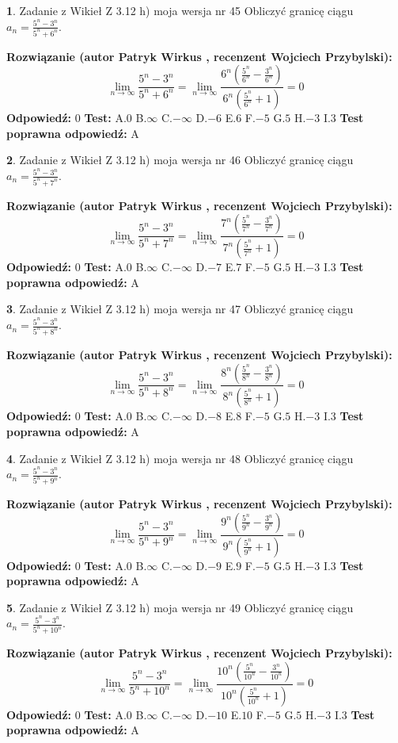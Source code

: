 \documentclass[12pt, a4paper]{article}
\theoremstyle{definition} %
\newtheorem{zad}{}
\newcommand{\zadStart}[1]{\begin{zad}#1\newline}
\newcommand{\zadStop}{\end{zad}}
\newcommand{\rozwStart}[2]{\noindent \textbf{Rozwiązanie (autor #1 , recenzent #2): }\newline}
\newcommand{\rozwStop}{\newline}
\newcommand{\odpStart}{\noindent \textbf{Odpowiedź:}\newline}
\newcommand{\odpStop}{\newline}
\newcommand{\testStart}{\noindent \textbf{Test:}\newline}
\newcommand{\testStop}{\newline}
\newcommand{\kluczStart}{\noindent \textbf{Test poprawna odpowiedź:}\newline}
\newcommand{\kluczStop}{\newline}
\begin{document}
\zadStart{Zadanie z Wikieł Z 3.12 h) moja wersja nr 45}
Obliczyć granicę ciągu $a_{n}=\frac{5^{n} - 3^{n}}{5^{n} + 6^{n}}$.
\zadStop
\rozwStart{Patryk Wirkus}{Wojciech Przybylski}
$$\lim\limits_{n\to\infty}\frac{5^{n} - 3^{n}}{5^{n} + 6^{n}} = \lim\limits_{n\to\infty}\frac{6^{n}(\frac{5^{n}}{6^{n}} - \frac{3^{n}}{6^{n}})}{6^{n}(\frac{5^{n}}{6^{n}} + 1)} = 0$$
\rozwStop
\odpStart
$0$
\odpStop
\testStart
A.$0$
B.$\infty$
C.$-\infty$
D.$-6$
E.$6$
F.$-5$
G.$5$
H.$-3$
I.$3$
\testStop
\kluczStart
A
\kluczStop



\zadStart{Zadanie z Wikieł Z 3.12 h) moja wersja nr 46}
Obliczyć granicę ciągu $a_{n}=\frac{5^{n} - 3^{n}}{5^{n} + 7^{n}}$.
\zadStop
\rozwStart{Patryk Wirkus}{Wojciech Przybylski}
$$\lim\limits_{n\to\infty}\frac{5^{n} - 3^{n}}{5^{n} + 7^{n}} = \lim\limits_{n\to\infty}\frac{7^{n}(\frac{5^{n}}{7^{n}} - \frac{3^{n}}{7^{n}})}{7^{n}(\frac{5^{n}}{7^{n}} + 1)} = 0$$
\rozwStop
\odpStart
$0$
\odpStop
\testStart
A.$0$
B.$\infty$
C.$-\infty$
D.$-7$
E.$7$
F.$-5$
G.$5$
H.$-3$
I.$3$
\testStop
\kluczStart
A
\kluczStop



\zadStart{Zadanie z Wikieł Z 3.12 h) moja wersja nr 47}
Obliczyć granicę ciągu $a_{n}=\frac{5^{n} - 3^{n}}{5^{n} + 8^{n}}$.
\zadStop
\rozwStart{Patryk Wirkus}{Wojciech Przybylski}
$$\lim\limits_{n\to\infty}\frac{5^{n} - 3^{n}}{5^{n} + 8^{n}} = \lim\limits_{n\to\infty}\frac{8^{n}(\frac{5^{n}}{8^{n}} - \frac{3^{n}}{8^{n}})}{8^{n}(\frac{5^{n}}{8^{n}} + 1)} = 0$$
\rozwStop
\odpStart
$0$
\odpStop
\testStart
A.$0$
B.$\infty$
C.$-\infty$
D.$-8$
E.$8$
F.$-5$
G.$5$
H.$-3$
I.$3$
\testStop
\kluczStart
A
\kluczStop



\zadStart{Zadanie z Wikieł Z 3.12 h) moja wersja nr 48}
Obliczyć granicę ciągu $a_{n}=\frac{5^{n} - 3^{n}}{5^{n} + 9^{n}}$.
\zadStop
\rozwStart{Patryk Wirkus}{Wojciech Przybylski}
$$\lim\limits_{n\to\infty}\frac{5^{n} - 3^{n}}{5^{n} + 9^{n}} = \lim\limits_{n\to\infty}\frac{9^{n}(\frac{5^{n}}{9^{n}} - \frac{3^{n}}{9^{n}})}{9^{n}(\frac{5^{n}}{9^{n}} + 1)} = 0$$
\rozwStop
\odpStart
$0$
\odpStop
\testStart
A.$0$
B.$\infty$
C.$-\infty$
D.$-9$
E.$9$
F.$-5$
G.$5$
H.$-3$
I.$3$
\testStop
\kluczStart
A
\kluczStop



\zadStart{Zadanie z Wikieł Z 3.12 h) moja wersja nr 49}
Obliczyć granicę ciągu $a_{n}=\frac{5^{n} - 3^{n}}{5^{n} + 10^{n}}$.
\zadStop
\rozwStart{Patryk Wirkus}{Wojciech Przybylski}
$$\lim\limits_{n\to\infty}\frac{5^{n} - 3^{n}}{5^{n} + 10^{n}} = \lim\limits_{n\to\infty}\frac{10^{n}(\frac{5^{n}}{10^{n}} - \frac{3^{n}}{10^{n}})}{10^{n}(\frac{5^{n}}{10^{n}} + 1)} = 0$$
\rozwStop
\odpStart
$0$
\odpStop
\testStart
A.$0$
B.$\infty$
C.$-\infty$
D.$-10$
E.$10$
F.$-5$
G.$5$
H.$-3$
I.$3$
\testStop
\kluczStart
A
\kluczStop
\end{document}
